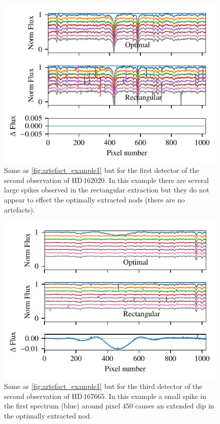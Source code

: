 \begin{figure}
    \centering
    \includegraphics[width=0.7\linewidth]{figures/appendix/bp_plots/rescaled_extraction_comparision_HD162020-2_chip_1}
    \caption[]{Same as \cref{fig:artefact_example1} but for the first detector of the second observation of {HD\,162020}.
        In this example there are several large spikes observed in the rectangular extraction but they do not appear to effect the optimally extracted nods (there are no artefacts).}
    \label{fig:artefact_example2}
\end{figure}
\begin{figure}
    \centering
    \includegraphics[width=0.7\linewidth]{figures/appendix/bp_plots/extraction_comparision_HD167665-1b_chip_3}
    \caption[]{Same as \cref{fig:artefact_example1} but for the third detector of the second observation of {HD\,167665}.
        In this example a small spike in the first spectrum (blue) around pixel 450 causes an extended dip in the optimally extracted nod.}
    \label{fig:artefact_example3}
\end{figure}
